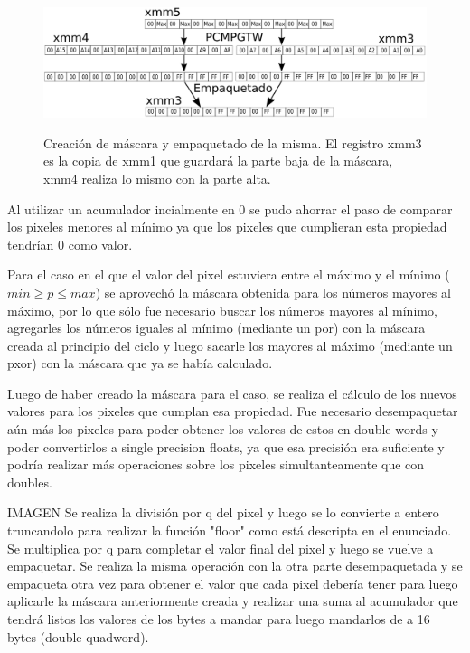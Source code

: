 \begin{figure}[ht!]
\centering
\includegraphics[width=150mm, height=40mm]{cpmmax.png}
\caption{Creación de máscara y empaquetado de la misma. El registro xmm3 es la copia de xmm1 que guardará la parte baja de la máscara, xmm4 realiza lo mismo con la parte alta.}
\label{overflow}
\end{figure}

Al utilizar un acumulador incialmente en 0 se pudo ahorrar el paso de comparar los pixeles menores al mínimo ya que los pixeles que cumplieran esta propiedad tendrían 0 como valor.

Para el caso en el que el valor del pixel estuviera entre el máximo y el mínimo ($min \geq p \leq max$) se aprovechó la máscara obtenida para los números mayores al máximo, por lo que sólo fue necesario buscar los números mayores al mínimo, agregarles los números iguales al mínimo (mediante un por) con la máscara creada al principio del ciclo y luego sacarle los mayores al máximo (mediante un pxor) con la máscara que ya se había calculado.

Luego de haber creado la máscara para el caso, se realiza el cálculo de los nuevos valores para los pixeles que cumplan esa propiedad. Fue necesario desempaquetar aún más los pixeles para poder obtener los valores de estos en double words y poder convertirlos a single precision floats, ya que esa precisión era suficiente y podría realizar más operaciones sobre los pixeles simultanteamente que con doubles.

IMAGEN
Se realiza la división por q del pixel y luego se lo convierte a entero truncandolo para realizar la función "floor" como está descripta en el enunciado. Se multiplica por q para completar el valor final del pixel y luego se vuelve a empaquetar. Se realiza la misma operación con la otra parte desempaquetada y se empaqueta otra vez para obtener el valor que cada pixel debería tener para luego aplicarle la máscara anteriormente creada y realizar una suma al acumulador que tendrá listos los valores de los bytes a mandar para luego mandarlos de a 16 bytes (double quadword).

